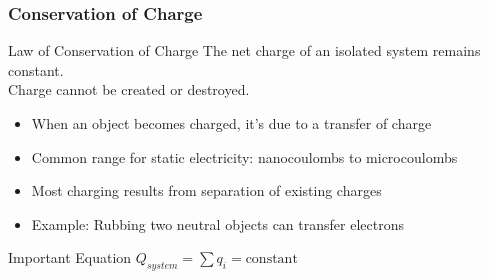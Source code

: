 \documentclass{beamer}
\newcommand{\highlight}[1]{\textcolor{ds9red}{#1}}
\begin{document}
\begin{frame}
    \frametitle{Conservation of Charge}
    
    \begin{block}{Law of Conservation of Charge}
        \centering
        The net charge of an isolated system remains constant.\\
        \vspace{0.5em}
        \highlight{Charge cannot be created or destroyed.}
    \end{block}
    
    \begin{itemize}
        \item When an object becomes charged, it's due to a \highlight{transfer} of charge
        \item Common range for static electricity: nanocoulombs to microcoulombs
        \item Most charging results from \highlight{separation} of existing charges
        \item Example: Rubbing two neutral objects can transfer electrons
    \end{itemize}
    
    \begin{alertblock}{Important Equation}
        $Q_{system} = \sum q_i = \text{constant}$
    \end{alertblock}
\end{frame}
\end{document}
